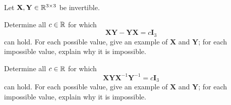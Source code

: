 \documentclass[11pt,oneside]{article}
\begin{document}
\begin{problem}
Let $\mathbf X,\mathbf Y\in\mathbb{R}^{3\times3}$ be invertible.
\begin{problemsubparts}
\item Determine all $c\in\mathbb{R}$ for which
\[
\mathbf X\mathbf Y-\mathbf Y\mathbf X=c\mathbf I_3
\]
can hold. For each possible value, give an example of $\mathbf X$ and $\mathbf Y$; for each impossible value, explain why it is impossible.
\item Determine all $c\in\mathbb{R}$ for which
\[
\mathbf X\mathbf Y\mathbf X^{-1}\mathbf Y^{-1}=c\mathbf I_3
\]
can hold. For each possible value, give an example of $\mathbf X$ and $\mathbf Y$; for each impossible value, explain why it is impossible.
\end{problemsubparts}
\end{problem}
\end{document}

